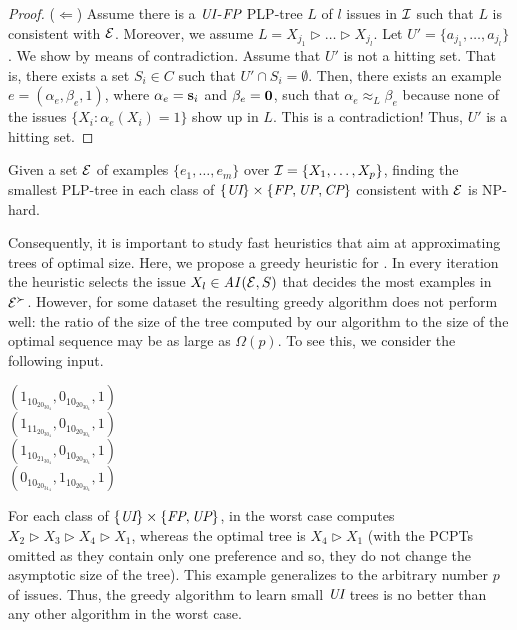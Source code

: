 \begin{proof}
\smallskip
\noindent
	($\Leftarrow$) Assume there is a $\textit{UI}$-$\textit{FP}$ PLP-tree $L$ of $l$ issues in
	$\mathcal{I}$ such that $L$ is consistent with $\mathcal{E}$. Moreover, we assume
	$L=X_{j_1} \triangleright \ldots \triangleright X_{j_l}$.
	Let $U'=\{a_{j_1}, \ldots,a_{j_l}\}$.
	We show by means of contradiction.  Assume that $U'$ is not a hitting set.
	That is, there exists a set $S_i \in C$ such that
	$U' \cap S_i = \emptyset$.
	Then, there exists an example $e=(\alpha_e,\beta_e,1)$, where $\alpha_e=\textbf{s}_i$ 
	and $\beta_e=\textbf{0}$, such that $\alpha_e \approx_L \beta_e$ because
	none of the issues $\{X_i:\alpha_e(X_i)=1\}$ show up in $L$. This is
	a contradiction! Thus, $U'$ is a hitting set.
\end{proof}

\begin{cor}
\label{cor:UIFP_smallest}
	Given a set $\mathcal{E}$ of examples $\{e_1,\ldots,e_m\}$ over $\mathcal{I}=\{X_1,\ldots,X_p\}$,
	finding the smallest PLP-tree in each class of $\{\textit{UI}\} \times \{\textit{FP},\textit{UP},\textit{CP}\}$ 
	consistent with $\mathcal{E}$ is NP-hard.
\end{cor}

Consequently, it is important to study fast heuristics that aim at
approximating trees of optimal size. 
Here, we propose a greedy heuristic for .
In every iteration the heuristic selects the issue $X_l \in \mathit{AI}(\mathcal{E},S)$ that
decides the most examples in $\mathcal{E}^\succ$.
However, for some dataset the resulting greedy algorithm does not perform 
well: the ratio of the size of the tree computed by our algorithm 
to the size of the optimal sequence may be as large as $\Omega(p)$.
To see this, we consider the following input.

\begin{framed}
	\vspace{-0.2cm}
	\noindent $(1_10_20_30_4,0_10_20_30_4,1)$\\
	$(1_11_20_30_4,0_10_20_30_4,1)$\\
	$(1_10_21_30_4,0_10_20_30_4,1)$\\
	$(0_10_20_31_4,1_10_20_30_4,1)$
	\vspace{-0.2cm}
\end{framed}

For each class of $\{\textit{UI}\} \times \{\textit{FP},\textit{UP}\}$,  in the worst 
case computes $X_2 \triangleright X_3 \triangleright X_4 \triangleright X_1$,
whereas the optimal tree is $X_4 \triangleright X_1$ (with
the PCPTs omitted as they contain only one preference and so, they do not
change the asymptotic size of the tree). This example generalizes to the
arbitrary number $p$ of issues. Thus, the greedy algorithm to learn small
$\textit{UI}$ trees is no better than any other algorithm in 
the worst case.

